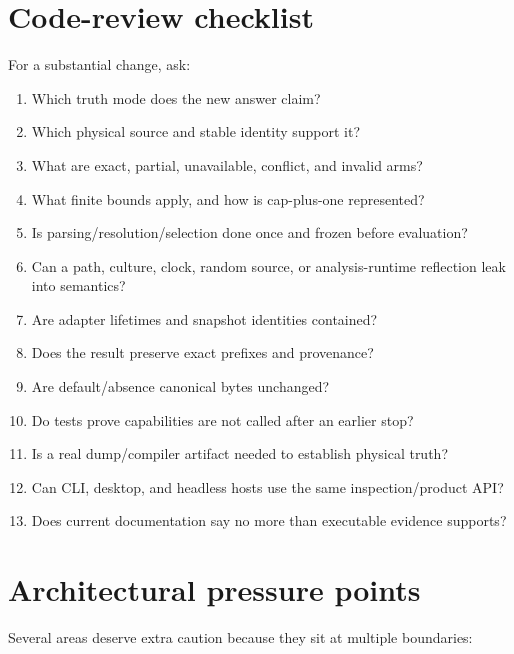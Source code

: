 \documentclass[11pt,oneside,openany]{book}
\begin{document}
\section{Code-review checklist}

For a substantial change, ask:

\begin{enumerate}
  \item Which truth mode does the new answer claim?
  \item Which physical source and stable identity support it?
  \item What are exact, partial, unavailable, conflict, and invalid arms?
  \item What finite bounds apply, and how is cap-plus-one represented?
  \item Is parsing/resolution/selection done once and frozen before evaluation?
  \item Can a path, culture, clock, random source, or analysis-runtime reflection leak into semantics?
  \item Are adapter lifetimes and snapshot identities contained?
  \item Does the result preserve exact prefixes and provenance?
  \item Are default/absence canonical bytes unchanged?
  \item Do tests prove capabilities are not called after an earlier stop?
  \item Is a real dump/compiler artifact needed to establish physical truth?
  \item Can CLI, desktop, and headless hosts use the same inspection/product API?
  \item Does current documentation say no more than executable evidence supports?
\end{enumerate}

\section{Architectural pressure points}

Several areas deserve extra caution because they sit at multiple boundaries:
\end{document}
